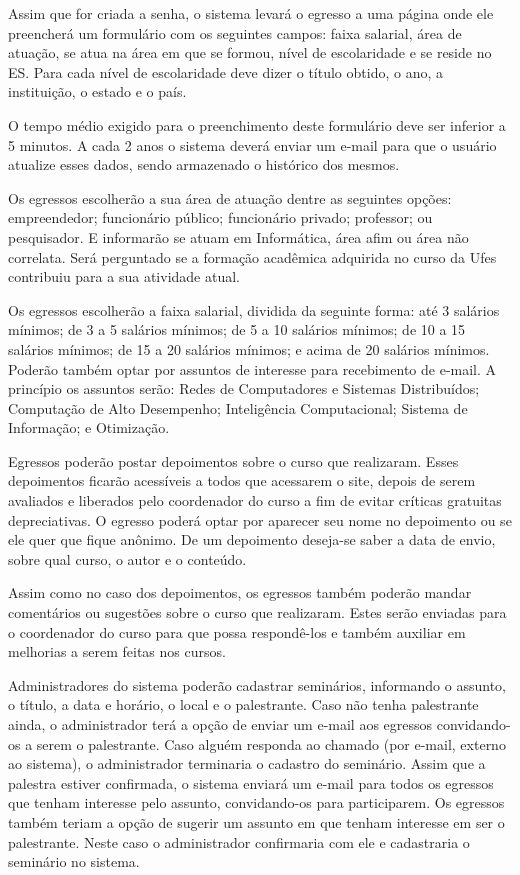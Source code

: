 Assim que for criada a senha, o sistema levará o egresso a uma página onde ele preencherá um formulário com os seguintes campos: faixa salarial, área de atuação, se atua na área em que se formou, nível de escolaridade e se reside no ES. Para cada nível de escolaridade deve dizer o título obtido, o ano, a instituição, o estado e o país.

O tempo médio exigido para o preenchimento deste formulário deve ser inferior a 5 minutos. A cada 2 anos o sistema deverá enviar um e-mail para que o usuário atualize esses dados, sendo armazenado o histórico dos mesmos.

Os egressos escolherão a sua área de atuação dentre as seguintes opções: empreendedor; funcionário público; funcionário privado; professor; ou pesquisador. E informarão se atuam em Informática, área afim ou área não correlata. Será perguntado se a formação acadêmica adquirida no curso da Ufes contribuiu para a sua atividade atual.

Os egressos escolherão a faixa salarial, dividida da seguinte forma: até 3 salários mínimos; de 3 a 5 salários mínimos; de 5 a 10 salários mínimos;  de 10 a 15 salários mínimos; de 15 a 20 salários mínimos; e acima de 20 salários mínimos. Poderão também optar por assuntos de interesse para recebimento de e-mail. A princípio os assuntos serão: Redes de Computadores e Sistemas Distribuídos; Computação de Alto Desempenho; Inteligência Computacional; Sistema de Informação; e Otimização. 

Egressos poderão postar depoimentos sobre o curso que realizaram. Esses depoimentos ficarão acessíveis a todos que acessarem o site, depois de serem avaliados e liberados pelo coordenador do curso a fim de evitar críticas gratuitas depreciativas. O egresso poderá optar por aparecer seu nome no depoimento ou se ele quer que fique anônimo. De um depoimento deseja-se saber a data de envio, sobre qual curso, o autor e o conteúdo. 

Assim como no caso dos depoimentos, os egressos também poderão mandar comentários ou sugestões sobre o curso que realizaram. Estes serão enviadas para o coordenador do curso para que possa respondê-los e também auxiliar em melhorias a serem feitas nos cursos. 

Administradores do sistema poderão cadastrar seminários, informando o assunto, o título, a data e horário, o local e o palestrante. Caso não tenha palestrante ainda, o administrador terá a opção de enviar um e-mail aos egressos convidando-os a serem o palestrante. Caso alguém responda ao chamado (por e-mail, externo ao sistema), o administrador terminaria o cadastro do seminário. Assim que a palestra estiver confirmada, o sistema enviará um e-mail para todos os egressos que tenham interesse pelo assunto, convidando-os para participarem. Os egressos também teriam a opção de sugerir um assunto em que tenham interesse em ser o palestrante. Neste caso o administrador confirmaria com ele e cadastraria o seminário no sistema.


